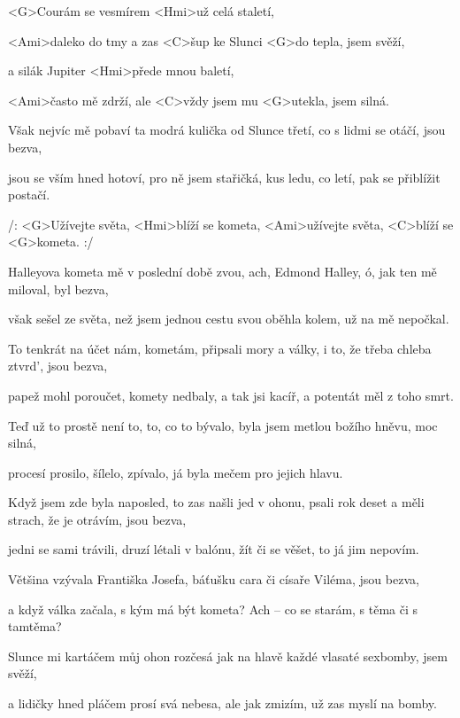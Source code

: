 

\zs
<G>Courám se vesmírem <Hmi>už celá staletí,

<Ami>daleko do tmy a zas <C>šup ke Slunci <G>do tepla, jsem svěží,

a silák Jupiter <Hmi>přede mnou baletí,

<Ami>často mě zdrží, ale <C>vždy jsem mu <G>utekla, jsem silná.
\ks

\zs
Však nejvíc mě pobaví ta modrá kulička od Slunce třetí, co s lidmi se otáčí, jsou bezva,

jsou se vším hned hotoví, pro ně jsem stařičká, kus ledu, co letí, pak se přiblížit postačí.
\ks

\zr
/: <G>Užívejte světa, <Hmi>blíží se kometa, <Ami>užívejte světa, <C>blíží se <G>kometa. :/
\kr

\zs
Halleyova kometa mě v poslední době zvou, ach, Edmond Halley, ó, jak ten mě miloval, byl bezva,

však sešel ze světa, než jsem jednou cestu svou oběhla kolem, už na mě nepočkal.
\ks

\zr\kr

\zs
To tenkrát na účet nám, kometám, připsali mory a války, i to, že třeba chleba ztvrd', jsou bezva,

papež mohl poroučet, komety nedbaly, a tak jsi kacíř, a potentát měl z toho smrt.

Teď už to prostě není to, to, co to bývalo, byla jsem metlou božího hněvu, moc silná,

procesí prosilo, šílelo, zpívalo, já byla mečem pro jejich hlavu.
\ks

\zr\kr

\zs
Když jsem zde byla naposled, to zas našli jed v ohonu, psali rok deset a měli strach, že je otrávím, jsou bezva,

jedni se sami trávili, druzí létali v balónu, žít či se věšet, to já jim nepovím.

Většina vzývala Františka Josefa, báťušku cara či císaře Viléma, jsou bezva,

a když válka začala, s kým má být kometa? Ach -- co se starám, s těma či s tamtěma?
\ks

\zr\kr

\zs
Slunce mi kartáčem můj ohon rozčesá jak na hlavě každé vlasaté sexbomby, jsem svěží,

a lidičky hned pláčem prosí svá nebesa, ale jak zmizím, už zas myslí na bomby.
\ks

